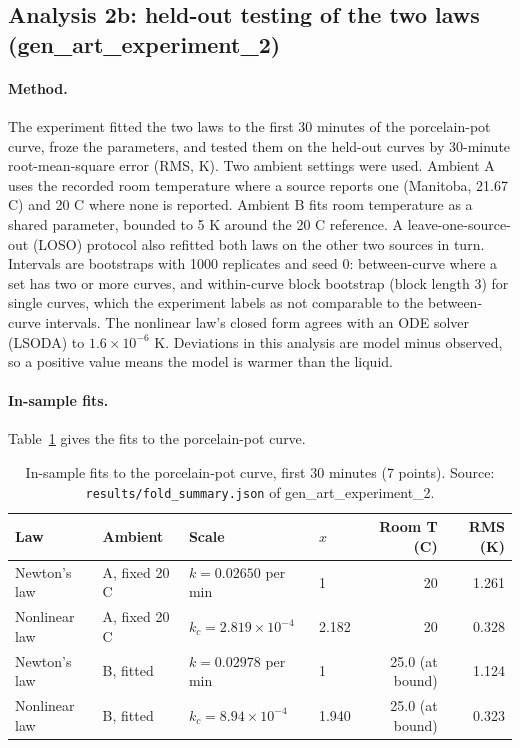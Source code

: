 \documentclass[11pt,letterpaper]{article}
\begin{document}
\subsection{Analysis 2b: held-out testing of the two laws (gen\_art\_experiment\_2)}

\paragraph{Method.} The experiment fitted the two laws to the first 30 minutes of the porcelain-pot curve, froze the parameters, and tested them on the held-out curves by 30-minute root-mean-square error (RMS, K). Two ambient settings were used. Ambient A uses the recorded room temperature where a source reports one (Manitoba, 21.67 C) and 20 C where none is reported. Ambient B fits room temperature as a shared parameter, bounded to 5 K around the 20 C reference. A leave-one-source-out (LOSO) protocol also refitted both laws on the other two sources in turn. Intervals are bootstraps with 1000 replicates and seed 0: between-curve where a set has two or more curves, and within-curve block bootstrap (block length 3) for single curves, which the experiment labels as not comparable to the between-curve intervals. The nonlinear law's closed form agrees with an ODE solver (LSODA) to $1.6 \times 10^{-6}$ K. Deviations in this analysis are model minus observed, so a positive value means the model is warmer than the liquid.

\paragraph{In-sample fits.} Table~\ref{tab:it2-insample} gives the fits to the porcelain-pot curve.

\begin{table}[!htbp]
\centering
\small
\caption{In-sample fits to the porcelain-pot curve, first 30 minutes (7 points). Source: \texttt{results/fold\_summary.json} of gen\_art\_experiment\_2.}
\label{tab:it2-insample}
\begin{tabularx}{\linewidth}{p{1.4cm}p{2.3cm}p{2.7cm}Xrr}
\toprule
Law & Ambient & Scale & $x$ & Room T (C) & RMS (K) \\
\midrule
Newton's law & A, fixed 20 C & $k = 0.02650$ per min & 1 & 20 & 1.261 \\
Nonlinear law & A, fixed 20 C & $k_c = 2.819\times10^{-4}$ & 2.182 & 20 & 0.328 \\
Newton's law & B, fitted & $k = 0.02978$ per min & 1 & 25.0 (at bound) & 1.124 \\
Nonlinear law & B, fitted & $k_c = 8.94\times10^{-4}$ & 1.940 & 25.0 (at bound) & 0.323 \\
\bottomrule
\end{tabularx}
\end{table}
\end{document}
